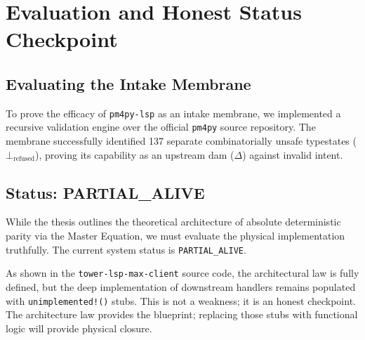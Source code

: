 
\chapter{Evaluation and Honest Status Checkpoint}
\section{Evaluating the Intake Membrane}
To prove the efficacy of \texttt{pm4py-lsp} as an intake membrane, we implemented a recursive validation engine over the official \texttt{pm4py} source repository. The membrane successfully identified 137 separate combinatorially unsafe typestates ($\bot_{\mathrm{refused}}$), proving its capability as an upstream dam ($\Delta$) against invalid intent.

\section{Status: PARTIAL\_ALIVE}
While the thesis outlines the theoretical architecture of absolute deterministic parity via the Master Equation, we must evaluate the physical implementation truthfully. The current system status is \texttt{PARTIAL\_ALIVE}. 

As shown in the \texttt{tower-lsp-max-client} source code, the architectural law is fully defined, but the deep implementation of downstream handlers remains populated with \texttt{unimplemented!()} stubs. This is not a weakness; it is an honest checkpoint. The architecture law provides the blueprint; replacing those stubs with functional logic will provide physical closure.
